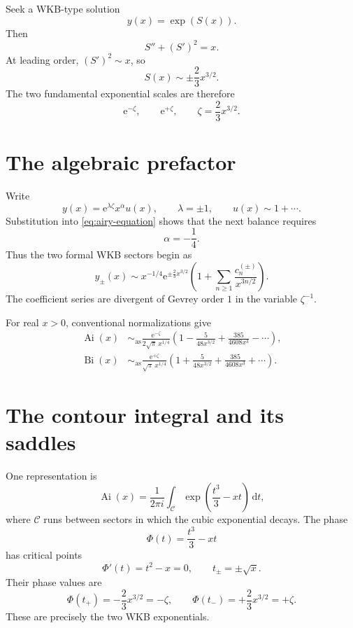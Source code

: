 \documentclass[11pt,oneside]{book}
\theoremstyle{definition}
\theoremstyle{remark}
\newcommand{\Ai}{\operatorname{Ai}}
\newcommand{\Bi}{\operatorname{Bi}}
\newcommand{\asympseries}{\sim_{\!\mathrm{as}}}
\newcommand{\e}{\mathrm{e}}
\newcommand{\dd}{\,\mathrm{d}}
\begin{document}
Seek a WKB-type solution
\[
  y(x)=\exp(S(x)).
\]
Then
\[
  S''+(S')^2=x.
\]
At leading order, $(S')^2\sim x$, so
\begin{equation}
  S(x)\sim\pm\frac23 x^{3/2}.
  \label{eq:airy-actions}
\end{equation}
The two fundamental exponential scales are therefore
\[
  \e^{-\zeta},\qquad \e^{+\zeta},
  \qquad \zeta=\frac23 x^{3/2}.
\]

\section{The algebraic prefactor}

Write
\[
  y(x)=\e^{\lambda\zeta}x^\alpha u(x),
  \qquad \lambda=\pm1,
  \qquad u(x)\sim1+\cdots.
\]
Substitution into \eqref{eq:airy-equation} shows that the next balance requires
\[
  \alpha=-\frac14.
\]
Thus the two formal WKB sectors begin as
\begin{equation}
  y_\pm(x)
  \sim x^{-1/4}\e^{\pm\frac23x^{3/2}}
  \left(1+\sum_{n\ge1}\frac{c_n^{(\pm)}}{x^{3n/2}}\right).
  \label{eq:airy-wkb-sectors}
\end{equation}
The coefficient series are divergent of Gevrey order $1$ in the variable
$\zeta^{-1}$.

For real $x>0$, conventional normalizations give
\begin{align}
  \Ai(x)
  &\asympseries
  \frac{\e^{-\zeta}}{2\sqrt\pi\,x^{1/4}}
  \left(1-\frac{5}{48x^{3/2}}
    +\frac{385}{4608x^3}-\cdots\right),
  \label{eq:airy-ai-positive}\\
  \Bi(x)
  &\asympseries
  \frac{\e^{+\zeta}}{\sqrt\pi\,x^{1/4}}
  \left(1+\frac{5}{48x^{3/2}}
    +\frac{385}{4608x^3}+\cdots\right).
  \label{eq:airy-bi-positive}
\end{align}

\section{The contour integral and its saddles}

One representation is
\begin{equation}
  \Ai(x)=\frac{1}{2\pi i}
  \int_{\mathcal C}
    \exp\!\left(\frac{t^3}{3}-xt\right)\dd t,
  \label{eq:airy-contour-integral}
\end{equation}
where $\mathcal C$ runs between sectors in which the cubic exponential decays.
The phase
\[
  \Phi(t)=\frac{t^3}{3}-xt
\]
has critical points
\[
  \Phi'(t)=t^2-x=0,
  \qquad t_\pm=\pm\sqrt x.
\]
Their phase values are
\[
  \Phi(t_+)=-\frac23x^{3/2}=-\zeta,
  \qquad
  \Phi(t_-)=+\frac23x^{3/2}=+\zeta.
\]
These are precisely the two WKB exponentials.
\end{document}
